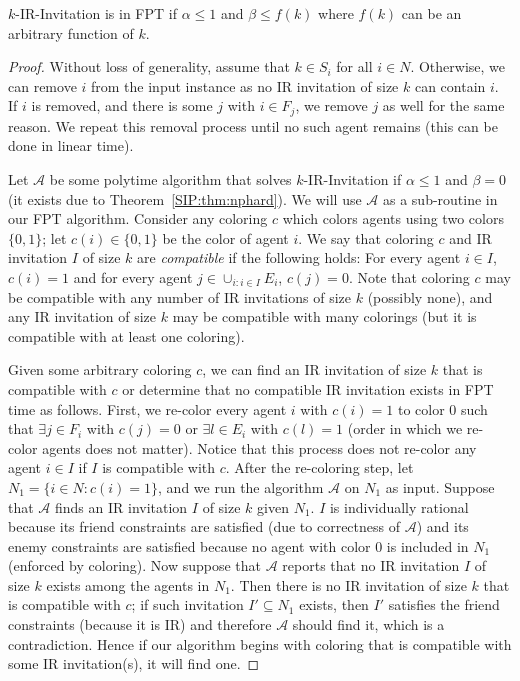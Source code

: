 \begin{theorem} \label{SIP:thm:IR_invitation_FPT}
	$k$-IR-Invitation is in FPT if $\alpha \leq 1$ and $\beta \leq f(k)$ where $f(k)$ can be an arbitrary function of $k$. 
\end{theorem}
\begin{proof}
	Without loss of generality, assume that $k\in S_i$ for all $i \in N$.
	Otherwise, we can remove $i$ from the input instance as no IR invitation of size $k$ can contain $i$. If $i$ is removed, and there is some $j$ with $i \in F_j$, we remove $j$ as well for the same reason. We repeat this removal process until no such agent remains (this can be done in linear time).

	Let $\mathcal{A}$ be some polytime algorithm that solves $k$-IR-Invitation if $\alpha \leq 1$ and $\beta = 0$ (it exists due to Theorem~\ref{SIP:thm:nphard}). We will use $\mathcal{A}$ as a sub-routine in our FPT algorithm. Consider any coloring $c$ which colors agents using two colors $\{0,1\}$; let $c(i) \in \{0,1\}$ be the color of agent $i$.
	We say that coloring $c$ and IR invitation $I$ of size $k$ are {\em compatible} if the following holds: For every agent $i\in I$, $c(i) = 1$ and for every agent $j \in \cup_{i: i\in I} E_i$, $c(j) = 0$. 
	Note that coloring $c$ may be compatible with any number of IR invitations of size $k$ (possibly none), and any IR invitation of size $k$ may be compatible with many colorings (but it is compatible with at least one coloring).
	
	Given some arbitrary coloring $c$, we can find an IR invitation of size $k$ that is compatible with $c$ or determine that no compatible IR invitation exists in FPT time as follows.
	First, we re-color every agent $i$ with $c(i)=1$ to color $0$ such that $\exists j\in F_i$ with $c(j)=0$ or $\exists l \in E_i$ with $c(l) = 1$ (order in which we re-color agents does not matter).
	Notice that this process does not re-color any agent $i\in I$ if $I$ is compatible with $c$. After the re-coloring step, let $N_1 = \{i\in N: c(i) = 1\}$, and we run the algorithm $\mathcal{A}$ on $N_1$ as input. Suppose that $\mathcal{A}$ finds an IR invitation $I$ of size $k$ given $N_1$. $I$ is individually rational because its friend constraints are satisfied (due to correctness of $\mathcal{A}$) and its enemy constraints are satisfied because no agent with color $0$ is included in $N_1$ (enforced by coloring). Now suppose that $\mathcal{A}$ reports that no IR invitation $I$ of size $k$ exists among the agents in $N_1$. Then there is no IR invitation of size $k$ that is compatible with $c$; if such invitation $I' \subseteq N_1$ exists, then $I'$ satisfies the friend constraints (because it is IR) and therefore $\mathcal{A}$ should find it, which is a contradiction. Hence if our algorithm begins with coloring that is compatible with some IR invitation(s), it will find one.


\end{proof}
